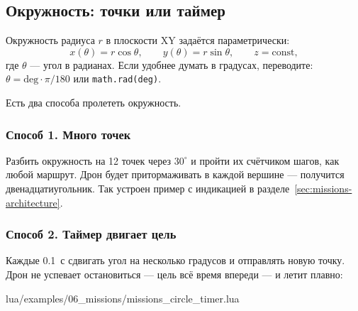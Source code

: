 \subsection{Окружность: точки или таймер}
\label{sec:missions-circle}

Окружность радиуса $r$ в плоскости XY задаётся параметрически:
\[
  x(\theta) = r\cos\theta,\qquad y(\theta) = r\sin\theta,\qquad z = \mathrm{const},
\]
где $\theta$ --- угол в радианах. Если удобнее думать в градусах, переводите: $\theta = \mathrm{deg}\cdot\pi/180$ или \verb|math.rad(deg)|.

Есть два способа пролететь окружность.

\subsubsection*{Способ 1. Много точек}

Разбить окружность на 12 точек через $30^\circ$ и пройти их счётчиком шагов, как любой маршрут. Дрон будет притормаживать в каждой вершине --- получится двенадцатиугольник. Так устроен пример с индикацией в разделе~\ref{sec:missions-architecture}.

\subsubsection*{Способ 2. Таймер двигает цель}

Каждые 0.1~с сдвигать угол на несколько градусов и отправлять новую точку. Дрон не успевает остановиться --- цель всё время впереди --- и летит плавно:

\begin{codefile}{lua/examples/06_missions/missions_circle_timer.lua}
\end{codefile}

